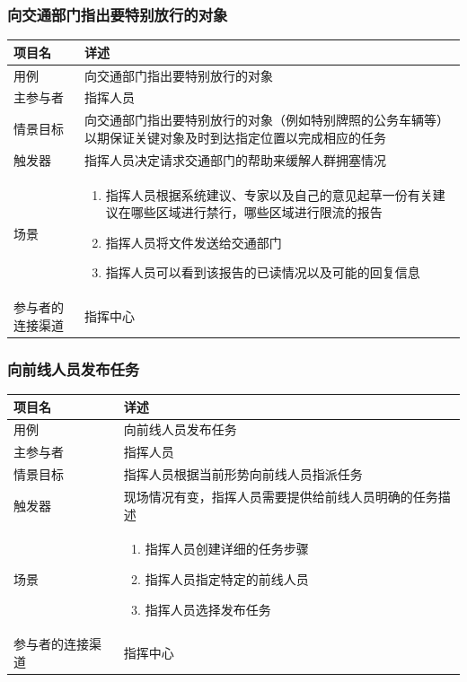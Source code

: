 \documentclass{ctexrep}
\begin{document}
\subsubsection{向交通部门指出要特别放行的对象}
\begin{longtable}{p{2cm} | p{10cm}}
\hline
项目名 & 详述 \\
\hline
\hline
用例 & 向交通部门指出要特别放行的对象\\
\hline
主参与者 &指挥人员 \\
\hline
情景目标 &  向交通部门指出要特别放行的对象（例如特别牌照的公务车辆等）以期保证关键对象及时到达指定位置以完成相应的任务\\
\hline
触发器 &  指挥人员决定请求交通部门的帮助来缓解人群拥塞情况\\
\hline
场景 & \begin{enumerate}
	\item 指挥人员根据系统建议、专家以及自己的意见起草一份有关建议在哪些区域进行禁行，哪些区域进行限流的报告
	\item 指挥人员将文件发送给交通部门
		\item 指挥人员可以看到该报告的已读情况以及可能的回复信息
\end{enumerate} \\
\hline
参与者的连接渠道 & 指挥中心 \\
\hline
\end{longtable}

\subsubsection{向前线人员发布任务}
\begin{longtable}{p{2cm} | p{10cm}}
\hline
项目名 & 详述 \\
\hline
\hline
用例 & 向前线人员发布任务\\
\hline
主参与者 & 指挥人员 \\
\hline
情景目标 &  指挥人员根据当前形势向前线人员指派任务\\
\hline
触发器 &  现场情况有变，指挥人员需要提供给前线人员明确的任务描述\\
\hline
场景 & \begin{enumerate}
	\item 指挥人员创建详细的任务步骤
	\item 指挥人员指定特定的前线人员
	\item 指挥人员选择发布任务
\end{enumerate} \\
\hline
参与者的连接渠道 & 指挥中心 \\
\hline
\end{longtable}
\end{document}
